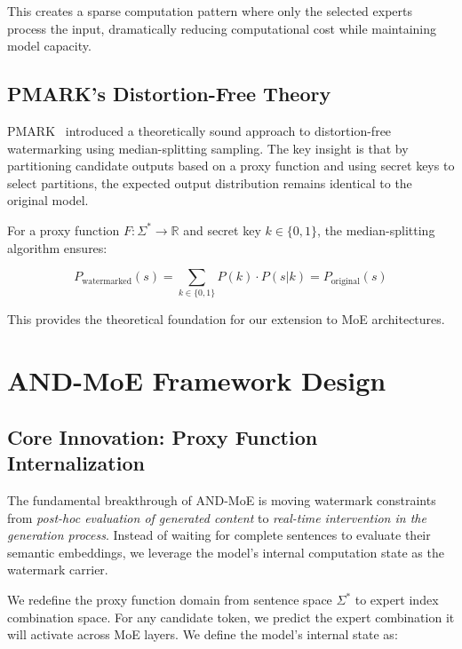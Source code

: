 \documentclass[letterpaper,twocolumn,10pt]{article}
\begin{document}
This creates a sparse computation pattern where only the selected experts process the input, dramatically reducing computational cost while maintaining model capacity.

\subsection{PMARK's Distortion-Free Theory}

PMARK~\cite{pmark2024} introduced a theoretically sound approach to distortion-free watermarking using median-splitting sampling. The key insight is that by partitioning candidate outputs based on a proxy function and using secret keys to select partitions, the expected output distribution remains identical to the original model.

For a proxy function $F: \Sigma^* \to \mathbb{R}$ and secret key $k \in \{0,1\}$, the median-splitting algorithm ensures:

\begin{equation}
P_{\text{watermarked}}(s) = \sum_{k \in \{0,1\}} P(k) \cdot P(s|k) = P_{\text{original}}(s)
\end{equation}

This provides the theoretical foundation for our extension to MoE architectures.

\section{AND-MoE Framework Design}

\subsection{Core Innovation: Proxy Function Internalization}

The fundamental breakthrough of AND-MoE is moving watermark constraints from \textit{post-hoc evaluation of generated content} to \textit{real-time intervention in the generation process}. Instead of waiting for complete sentences to evaluate their semantic embeddings, we leverage the model's internal computation state as the watermark carrier.

We redefine the proxy function domain from sentence space $\Sigma^*$ to expert index combination space. For any candidate token, we predict the expert combination it will activate across MoE layers. We define the model's internal state as:
\end{document}
